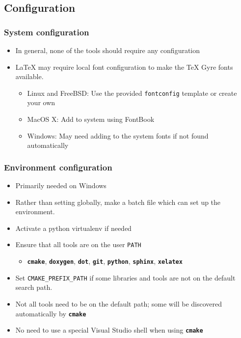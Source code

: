 \documentclass{beamer}
\newcommand{\cmd}[1]{\textbf{\texttt{#1}}}
\newcommand{\pkg}[1]{\texttt{#1}}
\begin{document}
\subsection{Configuration}

\begin{frame}
  \frametitle{System configuration}
  \begin{itemize}
    \item In general, none of the tools should require any configuration
      \item \LaTeX{} may require local font configuration to make the \TeX{} Gyre fonts available.
        \begin{itemize}
          \item Linux and FreeBSD: Use the provided \pkg{fontconfig}
            template or create your own
          \item MacOS X: Add to system using FontBook
          \item Windows: May need adding to the system fonts if not
            found automatically
        \end{itemize}
  \end{itemize}
\end{frame}

\begin{frame}
  \frametitle{Environment configuration}
  \begin{itemize}
    \item Primarily needed on Windows
    \item Rather than setting globally, make a batch file which can set up the environment.
    \item Activate a python virtualenv if needed
    \item Ensure that all tools are on the user \texttt{PATH}
      \begin{itemize}
        \item \cmd{cmake}, \cmd{doxygen}, \cmd{dot}, \cmd{git}, \cmd{python}, \cmd{sphinx}, \cmd{xelatex}
      \end{itemize}
    \item Set \texttt{CMAKE\_PREFIX\_PATH} if some libraries and tools are not on the default search path.
    \item Not all tools need to be on the default path; some will be discovered automatically by \cmd{cmake}
    \item No need to use a special Visual Studio shell when using \cmd{cmake}
  \end{itemize}
\end{frame}
\end{document}
